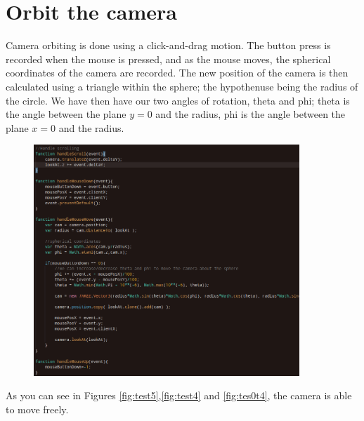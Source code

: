 \documentclass[12pt]{article}
\begin{document}
\section{Orbit the camera}
Camera orbiting is done using a click-and-drag motion. The button press is recorded when the mouse is pressed, and as the mouse moves, the spherical coordinates of the camera are recorded. The new position of the camera is then calculated using a triangle within the sphere; the hypothenuse being the radius of the circle. We have then have our two angles of rotation, theta and phi; theta is the angle between the plane $y=0$ and the radius, phi is the angle between the plane $x=0$ and the radius. 
\begin{figure}[H]  
  \centering
  \includegraphics[width=10cm]{22.png}
  \caption{}
  \label{fig:15}
\end{figure}
As you can see in Figures \ref{fig:test5},\ref{fig:test4} and \ref{fig:tes0t4}, the camera is able to move freely.
\end{document}
